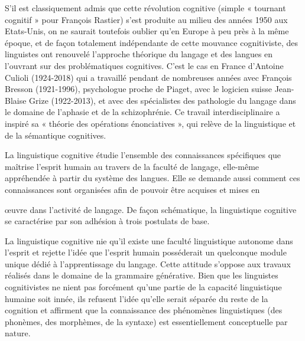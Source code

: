  S’il est classiquement admis que cette révolution cognitive (simple « tournant cognitif » pour François Rastier) s’est produite au milieu des années 1950 aux Etats-Unis, on ne saurait toutefois oublier qu’en Europe à peu près à la même époque, et de façon totalement indépendante de cette mouvance cognitiviste, des linguistes ont renouvelé l'approche théorique du langage et des langues en l’ouvrant sur des problématiques cognitives. C’est le cas en France d’Antoine Culioli (1924-2018) qui a travaillé pendant de nombreuses années avec François Bresson (1921-1996), psychologue proche de Piaget, avec le logicien suisse Jean-Blaise Grize (1922-2013), et avec des spécialistes des pathologie du langage dans le domaine de l’aphasie et de la schizophrénie. Ce travail interdisciplinaire a inspiré sa « théorie des opérations énonciatives », qui relève de la linguistique et de la sémantique cognitives.\par


La linguistique cognitive étudie l’ensemble des connaissances spécifiques que maîtrise l’esprit humain au travers de la faculté de langage, elle-même appréhendée à partir du système des langues. Elle se demande aussi comment ces connaissances sont organisées afin de pouvoir être acquises et mises en\par

œuvre dans l’activité de langage. De façon schématique, la linguistique cognitive se caractérise par son adhésion à trois postulats de base.\par




 La linguistique cognitive nie qu’il existe une faculté linguistique autonome dans l’esprit et rejette l'idée que l'esprit humain posséderait un quelconque module unique dédié à l'apprentissage du langage. Cette attitude s'oppose aux travaux réalisés dans le domaine de la grammaire générative. Bien que les linguistes cognitivistes ne nient pas forcément qu’une partie de la capacité linguistique humaine soit innée, ils refusent l’idée qu’elle serait séparée du reste de la cognition et affirment que la connaissance des phénomènes linguistiques (des phonèmes, des morphèmes, de la syntaxe) est essentiellement conceptuelle par nature.\par

